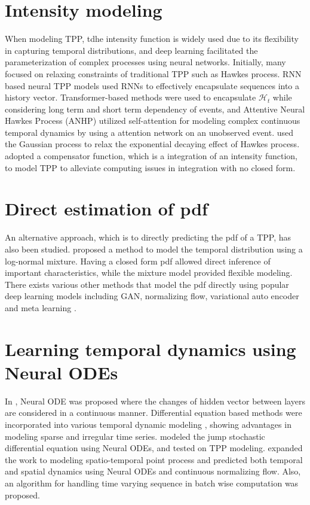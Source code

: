 \section {Intensity modeling} 
When modeling TPP, tdhe intensity function is widely used due to its flexibility in capturing temporal distributions, and 
deep learning facilitated the parameterization of complex processes using neural networks. 
Initially, many focused on relaxing constraints of traditional TPP \cite{bib:hawkesOrigin, ISHAM1979335, bib:daley} such as Hawkes process. 
RNN based neural TPP models \cite{bib:nhp, bib:RMTPP} used RNNs to effectively encapsulate sequences into a history vector. 
Transformer-based methods \cite{bib:THP, bib:sahp} were used to encapsulate $\mathcal{H}_t$ while considering long term and short term dependency of events, and 
Attentive Neural Hawkes Process (ANHP) \cite{bib:ANHP} utilized self-attention for modeling complex continuous temporal dynamics by using a attention network on an unobserved event. 
\cite{bib:nonparam} used the Gaussian process to relax the exponential decaying effect of Hawkes process. 
\cite{bib:fully_neural} adopted a compensator function, which is a integration of an intensity function, to model TPP to alleviate computing issues in integration with no closed form. 

\section{Direct estimation of pdf} 
An alternative approach, which is to directly predicting the pdf of a TPP, has also been studied. \cite{bib:ifl} proposed a method to model the temporal distribution using a log-normal mixture. 
Having a closed form pdf allowed direct inference of important characteristics, 
while the mixture model provided flexible modeling. 
There exists various other methods that model the pdf directly using popular deep learning models including GAN, normalizing flow, variational auto encoder and meta learning \cite{bib:exploring_generative, bib:MetaTPP}.

\section{Learning temporal dynamics using Neural ODEs} 
In \cite{bib:node}, Neural ODE was proposed where the changes of hidden vector between layers are considered in a continuous manner. 
Differential equation based methods were incorporated into various temporal dynamic modeling \cite{bib:neuralTemporalWalk,bib:counterfactualCDE,bib:SDEGames}, showing advantages in modeling sparse and irregular time series.
\cite{bib:NJSDE} modeled the jump stochastic differential equation using Neural ODEs, and tested on TPP modeling. 
\cite{bib:STPP} expanded the work to modeling spatio-temporal point process and predicted both temporal and spatial dynamics using Neural ODEs and continuous normalizing flow. Also, an algorithm for handling time varying sequence in batch wise computation was proposed.
